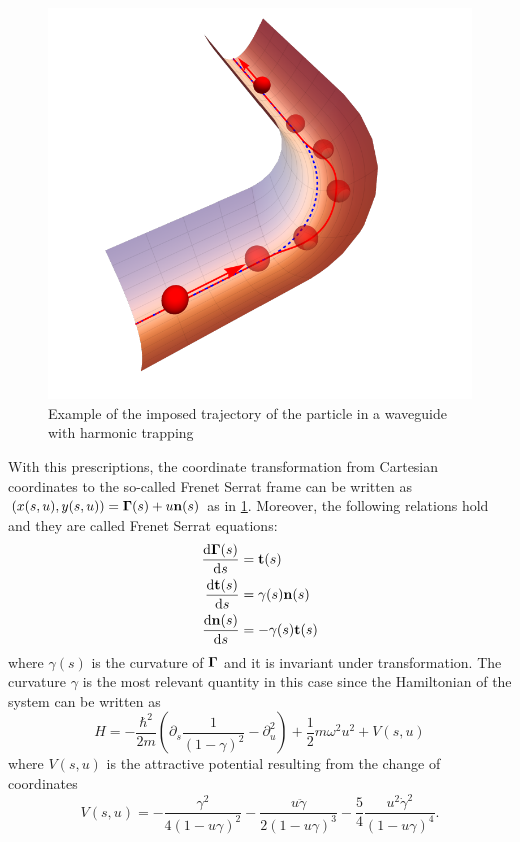\begin{figure}
		\includegraphics[width = .7\columnwidth]{gfx/tube.pdf}
		\caption{%
		 Example of the imposed trajectory of the particle in a waveguide with harmonic trapping}
		\label{fig:setup}
\end{figure}
With this prescriptions, the coordinate transformation from Cartesian coordinates to the so-called Frenet Serrat frame can be written as $(x(s,u), y(s,u)) = \mathbf{\Gamma}(s)  + u \mathbf{n}(s) $ as in \cref{fig:setup}.
Moreover, the following relations hold and they are called Frenet Serrat equations:
\begin{align}
	\diff{\Ga(s)}{s}  &= \mathbf{t}(s) \label{eq:frenet1}\\ 
	\diff{\mathbf{t}(s)}{s}  &= \gamma(s)\mathbf{n}(s) \label{eq:frenet2}\\ 
	\diff{\mathbf{n}(s)}{s}  &= -\gamma(s)\mathbf{t}(s) \label{eq:frenet3}
\end{align}
where $\gamma(s)$ is the curvature of $\mathbf{\Gamma}$ and it is invariant under transformation.
The curvature $\gamma$ is the most relevant quantity in this case since the Hamiltonian of the system can be written as 
\begin{equation}
	\label{eq:curvedhamilton}	
	H = - \frac{\hbar^2}{2m} \left( \partial_s \frac{1}{(1-\gamma)^2} - \partial_{u}^{2}\right)
	+ \frac{1}{2} m\omega^2u^2 + V(s,u)
\end{equation}
where $V(s,u)$ is the attractive potential resulting from the change of coordinates 
\begin{equation}
	\label{eq:potential}
	V(s,u) = -\frac{\gamma^2}{4(1-u\gamma)^2} - \frac{u\ddot{\gamma}}{2(1-u\gamma)^3} -\frac{5}{4}\frac{u^2\dot{\gamma}^2}{(1-u\gamma)^4}.
\end{equation}
